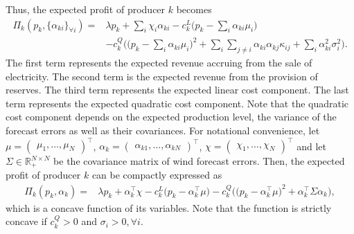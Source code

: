 \documentclass{article}
\begin{document}
Thus, the expected profit of producer $k$ becomes
\begin{align*}
\Pi_k(p_k, \{\alpha_{ki}\}_{\forall i}) =& \lambda p_k + \sum_i \chi_i \alpha_{ki} - c_k^L\Big(p_k - \sum_i \alpha_{ki} \mu_i\Big)\\
&- c_k^Q \Big(\big(p_k - \sum_i \alpha_{ki} \mu_i\big)^2 + \sum_i \sum_{j \ne i} \alpha_{ki} \alpha_{kj}  \kappa_{ij} + \sum_i \alpha_{ki}^2 \sigma_i^2\Big).
\end{align*}
The first term represents the expected revenue accruing from the sale of electricity. The second term is the expected revenue from the provision of reserves. The third term represents the expected linear cost component. The last term represents the expected quadratic cost component. Note that the quadratic cost component depends on the expected production level, the variance of the forecast errors as well as their covariances. For notational convenience, let $\mu = \begin{pmatrix} \mu_1, \ldots, \mu_N \end{pmatrix}^\top$, $\alpha_k = \begin{pmatrix} \alpha_{k1}, \ldots, \alpha_{kN} \end{pmatrix}^\top$, $\chi = \begin{pmatrix} \chi_1, \ldots, \chi_N \end{pmatrix}^\top$ and let $\Sigma \in \mathbb{R}_+^{N \times N}$ be the covariance matrix of wind forecast errors. Then, the expected profit of producer $k$ can be compactly expressed as
\begin{align*}
\Pi_k(p_k, \alpha_k) =& \lambda p_k + \alpha_k^\top \chi - c_k^L\big(p_k - \alpha_k^\top \mu\big) - c_k^Q \Big(\big(p_k - \alpha_{k}^\top \mu \big)^2 + \alpha_k^\top \Sigma \alpha_k\Big),
\end{align*}
which is a concave function of its variables. Note that the function is strictly concave if $c_k^Q > 0$ and $\sigma_i > 0, \forall i$.
\end{document}
